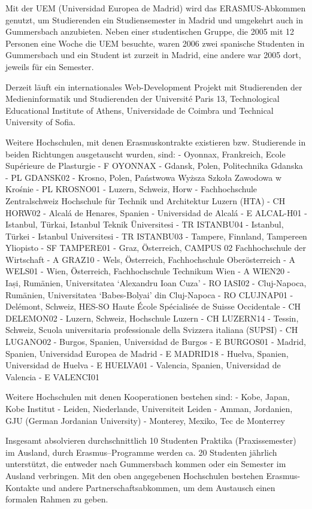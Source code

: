 Mit der UEM (Universidad Europea de Madrid) wird das ERASMUS-Abkommen
genutzt, um Studierenden ein Studiensemester in Madrid und umgekehrt
auch in Gummersbach anzubieten. Neben einer studentischen Gruppe, die
2005 mit 12 Personen eine Woche die UEM besuchte, waren 2006 zwei
spanische Studenten in Gummersbach und ein Student ist zurzeit in
Madrid, eine andere war 2005 dort, jeweils für ein Semester.

Derzeit läuft ein internationales Web-Development Projekt mit
Studierenden der Medieninformatik und Studierenden der Université Paris
13, Technological Educational Institute of Athens, Universidade de
Coimbra und Technical University of Sofia.

Weitere Hochschulen, mit denen Erasmuskontrakte existieren bzw.
Studierende in beiden Richtungen ausgetauscht wurden, sind: - Oyonnax,
Frankreich, Ecole Supérieure de Plasturgie - F OYONNAX - Gdansk, Polen,
Politechnika Gdanska - PL GDANSK02 - Krosno, Polen, Państwowa Wyższa
Szkoła Zawodowa w Krośnie - PL KROSNO01 - Luzern, Schweiz, Horw -
Fachhochschule Zentralschweiz Hochschule für Technik und Architektur
Luzern (HTA) - CH HORW02 - Alcalá de Henares, Spanien - Universidad de
Alcalá - E ALCAL-H01 - Istanbul, Türkai, Istanbul Teknik Üniversitesi -
TR ISTANBU04 - Istanbul, Türkei - Istanbul Universitesi - TR ISTANBU03 -
Tampere, Finnland, Tampereen Yliopisto - SF TAMPERE01 - Graz,
Österreich, CAMPUS 02 Fachhochschule der Wirtschaft - A GRAZ10 - Wels,
Österreich, Fachhochschule Oberösterreich - A WELS01 - Wien, Österreich,
Fachhochschule Technikum Wien - A WIEN20 - Iași, Rumänien, Universitatea
`Alexandru Ioan Cuza' - RO IASI02 - Cluj-Napoca, Rumänien, Universitatea
`Babes-Bolyai' din Cluj-Napoca - RO CLUJNAP01 - Delémont, Schweiz,
HES-SO Haute École Spécialisée de Suisse Occidentale - CH DELEMON02 -
Luzern, Schweiz, Hochschule Luzern - CH LUZERN14 - Tessin, Schweiz,
Scuola universitaria professionale della Svizzera italiana (SUPSI) - CH
LUGANO02 - Burgos, Spanien, Universidad de Burgos - E BURGOS01 - Madrid,
Spanien, Universidad Europea de Madrid - E MADRID18 - Huelva, Spanien,
Universidad de Huelva - E HUELVA01 - Valencia, Spanien, Universidad de
Valencia - E VALENCI01

Weitere Hochschulen mit denen Kooperationen bestehen sind: - Kobe,
Japan, Kobe Institut - Leiden, Niederlande, Universiteit Leiden - Amman,
Jordanien, GJU (German Jordanian University) - Monterey, Mexiko, Tec de
Monterrey

Insgesamt absolvieren durchschnittlich 10 Studenten Praktika
(Praxissemester) im Ausland, durch Erasmus--Programme werden ca. 20
Studenten jährlich unterstützt, die entweder nach Gummersbach kommen
oder ein Semester im Ausland verbringen. Mit den oben angegebenen
Hochschulen bestehen Erasmus-Kontakte und andere Partnerschaftsabkommen,
um dem Austausch einen formalen Rahmen zu geben.

